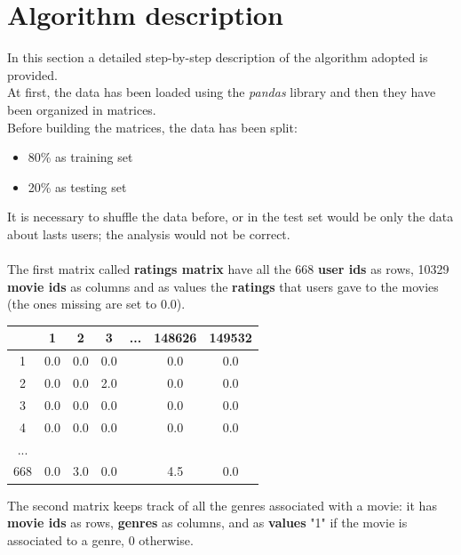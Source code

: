 \documentclass{article}
\begin{document}
\newpage

\section{Algorithm description}
In this section a detailed step-by-step description of the algorithm adopted is provided.\\
At first, the data has been loaded using the \textsl{pandas} library and then they have been organized in matrices.\\
Before building the matrices, the data has been split:
\begin{itemize}
      \item 80\% as training set
      \item 20\% as testing set
\end{itemize}
It is necessary to shuffle the data before, or in the test set would be only the data about lasts users; the analysis would not be correct.\\ \\
The first matrix called \textbf{ratings matrix} have all the 668 \textbf{user ids} as rows, 10329 \textbf{movie ids} as columns and as values the \textbf{ratings} that users gave to the movies (the ones missing are set to 0.0).\\
\begin{center}
      \begin{tabular}{ | c | c | c | c | c | c | c |} 
        \hline
        \rowcolor{lightgray}  & 1 & 2 & 3 & ... & 148626 & 149532 \\ 
        \hline
         \cellcolor{lightgray}1 & 0.0 & 0.0 & 0.0 &  & 0.0 & 0.0 \\ 
        \hline
        \cellcolor{lightgray}2 & 0.0 & 0.0 & 2.0 &  & 0.0 & 0.0 \\ 
        \hline
        \cellcolor{lightgray}3 & 0.0 & 0.0 & 0.0 &  & 0.0 & 0.0\\
        \hline
        \cellcolor{lightgray}4 & 0.0 & 0.0 & 0.0 &  & 0.0 & 0.0\\
        \hline
        \cellcolor{lightgray}... &  &  &  &  &  & \\ 
        \hline
        \cellcolor{lightgray}668 & 0.0 & 3.0 & 0.0 &  & 4.5 & 0.0\\
        \hline
      \end{tabular}
\end{center}
The second matrix keeps track of all the genres associated with a movie: it has \textbf{movie ids} as rows, \textbf{genres} as columns, and as \textbf{values} "1" if the movie is associated to a genre, 0 otherwise. \\
\end{document}
